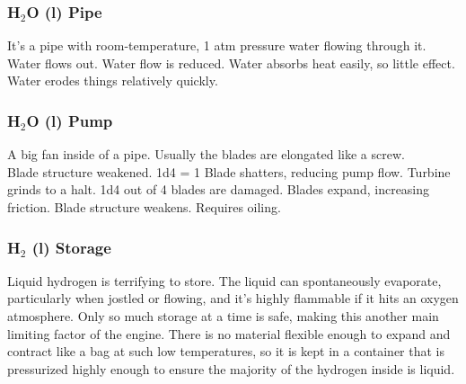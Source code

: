 \documentclass[a4paper]{article}
\begin{document}
\vspace{-0.5cm} \hspace{-18pt} \subsubsection{H$_2$O (l) Pipe} \label{engine_h2o_pipe} \vspace{-0.2cm}
It's a pipe with room-temperature, 1 atm pressure water flowing through it. 
\\ \pbhw
{Water flows out.}
{Water flow is reduced.}
{Water absorbs heat easily, so little effect.}
{Water erodes things relatively quickly.}


\vspace{-0.5cm} \hspace{-18pt} \subsubsection{H$_2$O (l) Pump} \label{engine_h2o_pump} \vspace{-0.2cm}
A big fan inside of a pipe. Usually the blades are elongated like a screw.
\\ \pbhw
{Blade structure weakened. 1d4 = 1 Blade shatters, reducing pump flow.}
{Turbine grinds to a halt. 1d4 out of 4 blades are damaged.}
{Blades expand, increasing friction. Blade structure weakens.}
{Requires oiling. }



\vspace{-0.5cm} \hspace{-18pt} \subsubsection{H$_2$ (l) Storage} \label{engine_h2_storage} \vspace{-0.2cm}
Liquid hydrogen is terrifying to store. The liquid can spontaneously evaporate, particularly when jostled or flowing, and it's highly flammable if it hits an oxygen atmosphere. Only so much storage at a time is safe, making this another main limiting factor of the engine. There is no material flexible enough to expand and contract like a bag at such low temperatures, so it is kept in a container that is pressurized highly enough to ensure the majority of the hydrogen inside is liquid.
\end{document}
